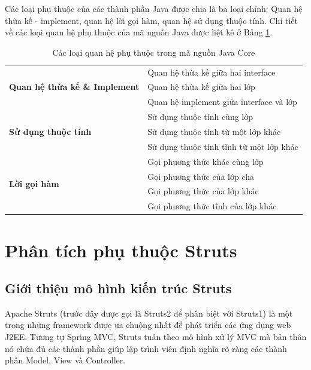 \documentclass[12pt]{report}
\begin{document}
Các loại phụ thuộc của các thành phần Java được chia là ba loại chính: Quan hệ thừa kế - implement, quan hệ lời gọi hàm, quan hệ sử dụng thuộc tính. Chi tiết về các loại quan hệ phụ thuộc của mã nguồn Java được liệt kê ở Bảng \ref{tbl:javacore-dependencies}.

\begin{table}[h]
\centering
\caption{Các loại quan hệ phụ thuộc trong mã nguồn Java Core}
\label{tbl:javacore-dependencies}
\begin{tabular}{|l|l|}
\hline
\multirow{3}{*}{\textbf{Quan hệ thừa kế \& Implement}} & Quan hệ thừa kế giữa hai interface \\ \cline{2-2} 
 & Quan hệ thừa kế giữa hai lớp \\ \cline{2-2} 
 & Quan hệ implement giữa interface và lớp \\ \hline
\multirow{3}{*}{\textbf{Sử dụng thuộc tính}} & Sử dụng thuộc tính cùng lớp \\ \cline{2-2} 
 & Sử dụng thuộc tính từ một lớp khác \\ \cline{2-2} 
 & Sử dụng thuộc tính tĩnh từ một lớp khác \\ \hline
\multirow{4}{*}{\textbf{Lời gọi hàm}} & Gọi phương thức khác cùng lớp \\ \cline{2-2} 
 & Gọi phương thức của lớp cha \\ \cline{2-2} 
 & Gọi phương thức của lớp khác \\ \cline{2-2} 
 & Gọi phương thức tĩnh của lớp khác \\ \hline
\end{tabular}
\end{table}

\section{Phân tích phụ thuộc Struts}
\subsection{Giới thiệu mô hình kiến trúc Struts}
Apache Struts (trước đây được gọi là Struts2 để phân biệt với Struts1) là một trong những framework được ưa chuộng nhất để phát triển các ứng dụng web J2EE. Tương tự Spring MVC, Struts tuân theo mô hình xử lý MVC mà bản thân nó chứa đủ các thành phần giúp lập trình viên định nghĩa rõ ràng các thành phần Model, View và Controller.
\end{document}
